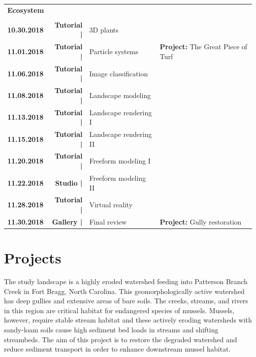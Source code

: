 \documentclass[11pt,article,oneside]{memoir}
\begin{document}
\begin{table}[H]
\begin{tabular}{l r @{\hskip 0.1cm} l @{\hskip 0.5cm} l}
\normalsize
\textbf{Ecosystem}\\
\small
\\
\textbf{10.30.2018} & \textbf{Tutorial |} & 3D plants \\
\textbf{11.01.2018} & \textbf{Tutorial |} & Particle systems & \textbf{Project:} The Great Piece of Turf \\
%
\textbf{11.06.2018} & \textbf{Tutorial |} & Image classification \\
\textbf{11.08.2018} & \textbf{Tutorial |} & Landscape modeling \\
%
\textbf{11.13.2018} & \textbf{Tutorial |} & Landscape rendering I \\
\textbf{11.15.2018} & \textbf{Tutorial |} & Landscape rendering II \\
%
\textbf{11.20.2018} & \textbf{Tutorial |} & Freeform modeling I \\
\textbf{11.22.2018} & \textbf{Studio |} & Freeform modeling II \\
%
\textbf{11.28.2018} & \textbf{Tutorial |} & Virtual reality\\
\textbf{11.30.2018} & \textbf{Gallery |} & Final review & \textbf{Project:} Gully restoration \\ 
%
\end{tabular}
\end{table}

\clearpage

%


\section{Projects}
The study landscape is a highly eroded watershed
feeding into Patterson Branch Creek in Fort Bragg, North Carolina.
This geomorphologically active watershed has deep gullies and
extensive areas of bare soils.
The creeks, streams, and rivers in this region are critical habitat
for endangered species of mussels.
Mussels, however, require stable stream habitat
and these actively eroding watersheds with sandy-loam soils
cause high sediment bed loads in streams and shifting streambeds.
The aim of this project is to restore the degraded watershed
and reduce sediment transport  
in order to enhance downstream mussel habitat.\\
\end{document}
